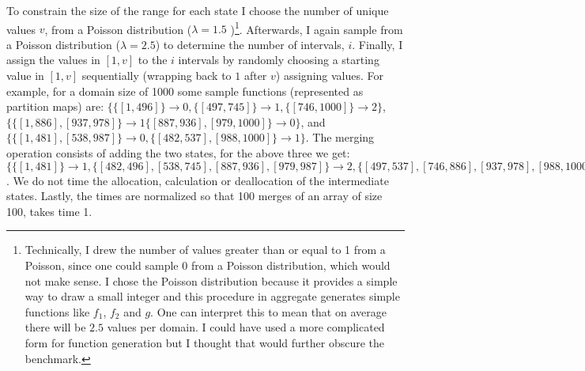\documentclass{article}
\begin{document}
To constrain the size of the range for each state I choose the number of
unique values $v$, from a Poisson distribution ($\lambda=1.5$
)\footnote{
Technically,
I drew the number of values greater than or equal to 1 from a Poisson,
since one could sample 0 from a Poisson distribution,
which would not make sense.
I chose the Poisson distribution because it provides a simple way to
draw a small integer and this procedure in aggregate generates simple functions
like $f_{1}$, $f_{2}$ and $g$.
One can interpret this to mean that on average there will be $2.5$ values
per domain.
I could have used a more complicated form for function generation but I
thought that would further obscure the benchmark.}.
Afterwards, I again sample from a Poisson distribution ($\lambda=2.5$) to
determine the number of intervals, $i$.
Finally, I assign the values in $[1,v]$ to the $i$ intervals by randomly
choosing a starting value in $[1,v]$
sequentially (wrapping back to $1$ after $v$)
assigning values.
For example,
for a domain size of 1000 some sample functions (represented as partition maps)
are:
$\{\{[1,496]\}\rightarrow0, \{[497,745]\} \rightarrow 1, \{[746,1000]\} \rightarrow 2\}$,
$\{\{[1,886],[937,978]\}\rightarrow 1 \{[887,936],[979,1000]\} \rightarrow 0 \}$,
and
$\{\{[1,481],[538,987]\}\rightarrow 0, \{[482,537],[988,1000]\}\rightarrow 1\}$.
The merging operation consists of adding the two states,
for the above three we get:
$\{ \{[1,481]\}\rightarrow1,
    \{[482,496],[538,745],[887,936],[979,987]\}\rightarrow2,
    \{[497,537],[746,886],[937,978],[988,1000]\}\rightarrow3 \}$.
We do not time the allocation, calculation or deallocation of the
intermediate states.
Lastly,
the times are normalized so that 100 merges of an array of size 100, takes time 1.
\end{document}
